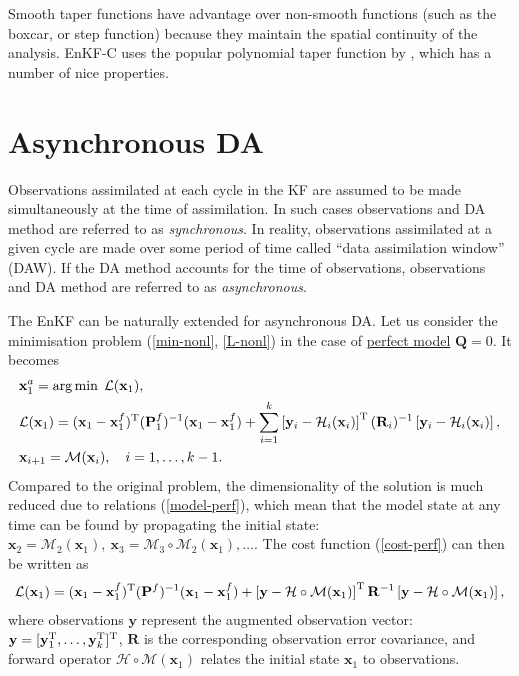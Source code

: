 \documentclass[11pt]{report}
\newcommand{\mb} {\mathbf}
\newcommand{\T}{^{\tiny \mathrm T}}
\begin{document}
Smooth taper functions have advantage over non-smooth functions (such as the boxcar, or step function) because they maintain the spatial continuity of the analysis.
EnKF-C uses the popular polynomial taper function by \citet{gas99a}, which has a number of nice properties.

\section{Asynchronous DA}

Observations assimilated at each cycle in the KF are assumed to be made simultaneously at the time of assimilation.
In such cases observations and DA method are referred to as \emph{synchronous}.
In reality, observations assimilated at a given cycle are made over some period of time called ``data assimilation window'' (DAW).
If the DA method accounts for the time of observations, observations and DA method are referred to as \emph{asynchronous}.

The EnKF can be naturally extended for asynchronous DA.
Let us consider the minimisation problem (\ref{min-nonl}, \ref{L-nonl}) in the case of \underline{perfect model} $\mb Q = 0$.
It becomes
\begin{align}
  \label{min-perf}
  &{\mb x_1^a} = \arg \min \; \mathcal L(\mb x_1),\\
  \label{cost-perf}
  &\mathcal L(\mb x_1)  = (\mb x_1 - \mb x_1^f)\T (\mb P_1^f)^{-1} (\mb x_1 - \mb x_1^f) + \sum_{i = 1}^k \left [ \mb y_i - \mathcal H_i(\mb x_i) \right ] \T (\mb R_i)^{-1} \left [ \mb y_i - \mathcal H_i(\mb x_i) \right ],\\
  \label{model-perf}
  &\mb x_{i+1} = \mathcal M(\mb x_i),\quad i = 1,\dots,k-1.
\end{align}
Compared to the original problem, the dimensionality of the solution is much reduced due to relations (\ref{model-perf}), which mean that the model state at any time can be found by propagating the initial state: $\mb x_2 = \mathcal M_2(\mb x_1),\ \mb x_3 = \mathcal M_3 \circ \mathcal M_2(\mb x_1), \dots$.
The cost function (\ref{cost-perf}) can then be written as
\begin{align}
  \label{cost-async}
  \mathcal L(\mb x_1)  = (\mb x_1 - \mb x_1^f)\T (\mb P^f)^{-1} (\mb x_1 - \mb x_1^f) + \left [ \mb y - \mathcal H \circ \mathcal M(\mb x_1) \right ] \T \mb R^{-1} \left [ \mb y - \mathcal H\circ \mathcal M(\mb x_1) \right ],
\end{align}
where observations $\mb y$ represent the augmented observation vector: $\mb y = [\mb y_1\T,\dots,\mb y_k\T]\T$, $\mb R$ is the corresponding observation error covariance, and forward operator $\mathcal H \circ \mathcal M (\mb x_1)$ relates the initial state $\mb x_1$ to observations.
\end{document}
